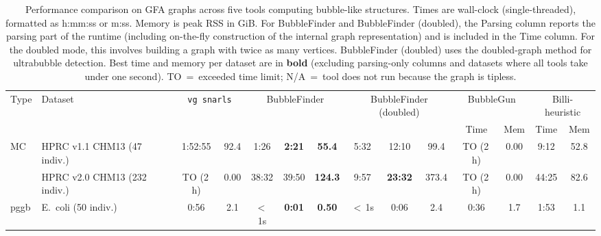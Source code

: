 \begin{table}[ht]
\centering
{}
\caption{Performance comparison on GFA graphs across five tools computing bubble-like structures.
  Times are wall-clock (single-threaded), formatted as h:mm:ss or m:ss.
  Memory is peak RSS in GiB. For BubbleFinder and BubbleFinder (doubled), the Parsing column reports the parsing part of the runtime (including on-the-fly construction of the internal graph representation) and is included in the Time column. For the doubled mode, this involves building a graph with twice as many vertices.
  BubbleFinder (doubled) uses the doubled-graph method for ultrabubble detection.
  Best time and memory per dataset are in \textbf{bold} (excluding parsing-only columns and datasets where all tools take under one second).
  TO~=~exceeded time limit; N/A~=~tool does not run because the graph is tipless.}
\label{tab:gfa}
\renewcommand{\arraystretch}{1.15}
\setlength{\tabcolsep}{4pt}
\begin{adjustbox}{max width=\linewidth}
\begin{tabular}{l l c c c c c c c c c c c c}
\toprule
\multirow{2}{*}{Type} & \multirow{2}{*}{Dataset} &
\multicolumn{2}{c}{\cellcolor{famSnarl}\texttt{vg snarls}} &
\multicolumn{3}{c}{\cellcolor{famBiSB}BubbleFinder} &
\multicolumn{3}{c}{\cellcolor{famBiSB}BubbleFinder (doubled)} &
\multicolumn{2}{c}{BubbleGun} &
\multicolumn{2}{c}{Billi-heuristic} \\
 & &
\cellcolor{famSnarl}{\scriptsize Time} & \cellcolor{famSnarl}{\scriptsize Mem} &
\cellcolor{famBiSB}{\scriptsize Parsing} &
\cellcolor{famBiSB}{\scriptsize Time} & \cellcolor{famBiSB}{\scriptsize Mem} &
\cellcolor{famBiSB}{\scriptsize Parsing} &
\cellcolor{famBiSB}{\scriptsize Time} & \cellcolor{famBiSB}{\scriptsize Mem} &
{\scriptsize Time} & {\scriptsize Mem} &
{\scriptsize Time} & {\scriptsize Mem} \\
\midrule
\multirow{2}{*}{\textsf{MC}} & \textsf{HPRC v1.1 CHM13 (47 indiv.)} & 1:52:55 & 92.4 & 1:26 & \textbf{2:21} & \textbf{55.4} & 5:32 & 12:10 & 99.4 & TO (2\,h) & 0.00 & 9:12 & 52.8 \\
 & \textsf{HPRC v2.0 CHM13 (232 indiv.)} & TO (2\,h) & 0.00 & 38:32 & 39:50 & \textbf{124.3} & 9:57 & \textbf{23:32} & 373.4 & TO (2\,h) & 0.00 & 44:25 & 82.6 \\
\hline
\multirow{4}{*}{\textsf{pggb}} & \textsf{E.~coli (50 indiv.)} & 0:56 & 2.1 & $<$\,1s & \textbf{0:01} & \textbf{0.50} & $<$\,1s & 0:06 & 2.4 & 0:36 & 1.7 & 1:53 & 1.1 \\

\end{tabular}
\end{adjustbox}
\end{table}
